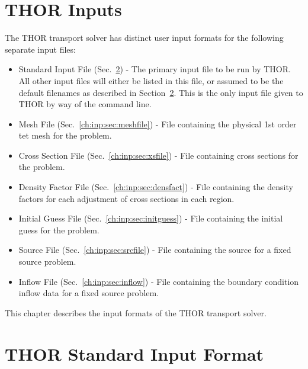 \section{THOR Inputs}\label{sec:THOR_format}

The THOR transport solver has distinct user input formats for the following separate input files:
\begin{itemize}
    \item Standard Input File (Sec.~\ref{ch:inp:sec:stdinput}) - The primary input file to be run by THOR.
    All other input files will either be listed in this file, or assumed to be the default filenames as described in Section~\ref{ch:inp:sec:stdinput}.
    This is the only input file given to THOR by way of the command line.
    \item Mesh File (Sec.~\ref{ch:inp:sec:meshfile}) - File containing the physical 1st order tet mesh for the problem.
    \item Cross Section File (Sec.~\ref{ch:inp:sec:xsfile}) - File containing cross sections for the problem.
    \item Density Factor File (Sec.~\ref{ch:inp:sec:densfact}) - File containing the density factors for each adjustment of cross sections in each region.
    \item Initial Guess File (Sec.~\ref{ch:inp:sec:initguess}) - File containing the initial guess for the problem.
    \item Source File (Sec.~\ref{ch:inp:sec:srcfile}) - File containing the source for a fixed source problem.
    \item Inflow File (Sec.~\ref{ch:inp:sec:inflow}) - File containing the boundary condition inflow data for a fixed source problem.
\end{itemize}

This chapter describes the input formats of the THOR transport solver.

\section{THOR Standard Input Format}\label{ch:inp:sec:stdinput}

